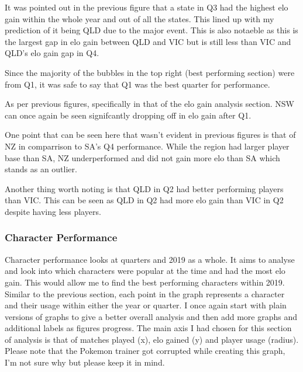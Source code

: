 \documentclass[11pt, oneside, a4paper]{article}
\begin{document}
It was pointed out in the previous figure that a state in Q3 had the highest elo gain within the whole year and out of all the states. This lined up with my prediction of it being QLD due to the major event. This is also notaeble as this is the largest gap in elo gain between QLD and VIC but is still less than VIC and QLD's elo gain gap in Q4.

Since the majority of the bubbles in the top right (best performing section) were from Q1, it was safe to say that Q1 was the best quarter for performance.

As per previous figures, specifically in that of the elo gain analysis section. NSW can once again be seen signifcantly dropping off in elo gain after Q1. 

One point that can be seen here that wasn't evident in previous figures is that of NZ in comparrison to SA's Q4 performance. While the region had larger player base than SA, NZ underperformed and did not gain more elo than SA which stands as an outlier. 

Another thing worth noting is that QLD in Q2 had better performing players than VIC. This can be seen as QLD in Q2 had more elo gain than VIC in Q2 despite having less players.

\newpage
\subsubsection{Character Performance}
Character performance looks at quarters and 2019 as a whole. It aims to analyse and look into which characters were popular at the time and had the most elo gain. This would allow me to find the best performing characters within 2019. Similar to the previous section, each point in the graph represents a character and their usage within either the year or quarter. I once again start with plain versions of graphs to give a better overall analysis and then add more graphs and additional labels as figures progress. The main axis I had chosen for this section of analysis is that of matches played (x), elo gained (y) and player usage (radius). Please note that the Pokemon trainer got corrupted while creating this graph, I'm not sure why but please keep it in mind.
\end{document}
